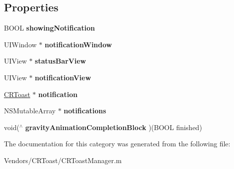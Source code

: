 \subsection*{Properties}
\begin{DoxyCompactItemize}
\item 
\hypertarget{category_c_r_toast_manager_07_08_a67a73aeaa17787c04af4723a54e5bb93}{}B\+O\+O\+L {\bfseries showing\+Notification}\label{category_c_r_toast_manager_07_08_a67a73aeaa17787c04af4723a54e5bb93}

\item 
\hypertarget{category_c_r_toast_manager_07_08_a01e3a6ad87eb81f2448a2c5c7bc8cad5}{}U\+I\+Window $\ast$ {\bfseries notification\+Window}\label{category_c_r_toast_manager_07_08_a01e3a6ad87eb81f2448a2c5c7bc8cad5}

\item 
\hypertarget{category_c_r_toast_manager_07_08_ac91954a7036a47dbba07171bc36c699d}{}U\+I\+View $\ast$ {\bfseries status\+Bar\+View}\label{category_c_r_toast_manager_07_08_ac91954a7036a47dbba07171bc36c699d}

\item 
\hypertarget{category_c_r_toast_manager_07_08_a6d6473b0a0cdbd99674c98b84685f540}{}U\+I\+View $\ast$ {\bfseries notification\+View}\label{category_c_r_toast_manager_07_08_a6d6473b0a0cdbd99674c98b84685f540}

\item 
\hypertarget{category_c_r_toast_manager_07_08_a0318350a5a472db5e06fb9f793c0ea8d}{}\hyperlink{interface_c_r_toast}{C\+R\+Toast} $\ast$ {\bfseries notification}\label{category_c_r_toast_manager_07_08_a0318350a5a472db5e06fb9f793c0ea8d}

\item 
\hypertarget{category_c_r_toast_manager_07_08_af203667da0ef54c9feb3dea2a695c350}{}N\+S\+Mutable\+Array $\ast$ {\bfseries notifications}\label{category_c_r_toast_manager_07_08_af203667da0ef54c9feb3dea2a695c350}

\item 
\hypertarget{category_c_r_toast_manager_07_08_aefa6384095581bf68d12907f932b583e}{}void($^\wedge$ {\bfseries gravity\+Animation\+Completion\+Block} )(B\+O\+O\+L finished)\label{category_c_r_toast_manager_07_08_aefa6384095581bf68d12907f932b583e}

\end{DoxyCompactItemize}


The documentation for this category was generated from the following file\+:\begin{DoxyCompactItemize}
\item 
Vendors/\+C\+R\+Toast/C\+R\+Toast\+Manager.\+m\end{DoxyCompactItemize}
